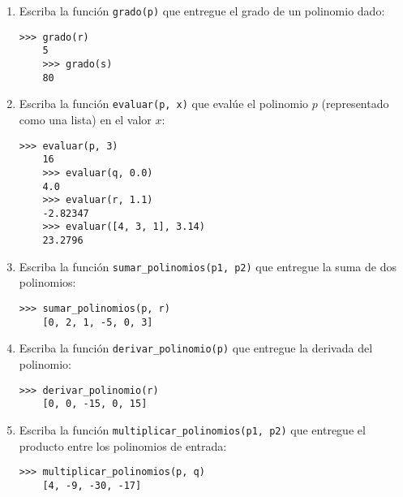   \begin{enumerate}
  \item 
    Escriba la función \texttt{grado(p)}
    que entregue el grado de un polinomio dado:
    \begin{lstlisting}[style=consola]
    >>> grado(r)
    5
    >>> grado(s)
    80
    \end{lstlisting}
  \item
    Escriba la función \texttt{evaluar(p, x)}
    que evalúe el polinomio \(p\) 
    (representado como una lista)
    en el valor \(x\):
    \begin{lstlisting}[style=consola]
    >>> evaluar(p, 3)
    16
    >>> evaluar(q, 0.0)
    4.0
    >>> evaluar(r, 1.1)
    -2.82347
    >>> evaluar([4, 3, 1], 3.14)
    23.2796
    \end{lstlisting}
  \item
    Escriba la función \texttt{sumar\_polinomios(p1, p2)}
    que entregue la suma de dos polinomios:
    \begin{lstlisting}[style=consola]
    >>> sumar_polinomios(p, r)
    [0, 2, 1, -5, 0, 3]
    \end{lstlisting}
  \item
    Escriba la función \texttt{derivar\_polinomio(p)}
    que entregue la derivada del polinomio:
    \begin{lstlisting}[style=consola]
    >>> derivar_polinomio(r)
    [0, 0, -15, 0, 15]
    \end{lstlisting}
  \item
    Escriba la función \texttt{multiplicar\_polinomios(p1, p2)}
    que entregue el producto entre los polinomios de entrada:
    \begin{lstlisting}[style=consola]
    >>> multiplicar_polinomios(p, q)
    [4, -9, -30, -17]
    \end{lstlisting}
  \end{enumerate}
  \pagebreak[4]